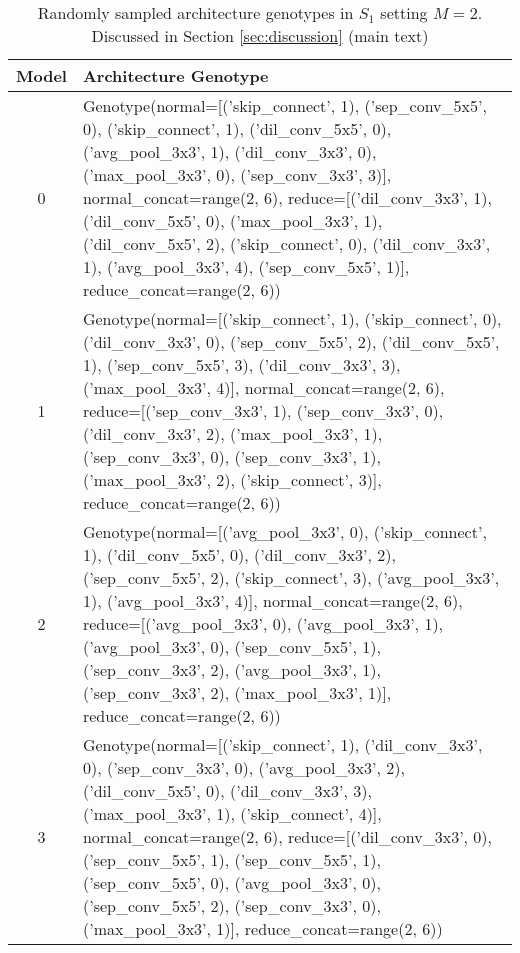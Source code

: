 \documentclass[runningheads]{llncs}
\begin{document}
\begin{table*}
	\begin{center}
		\caption{Randomly sampled architecture genotypes in $S_1$ setting $M=2$. Discussed in Section \ref{sec:discussion} (main text)}
		\label{tab:random-m2noflops}
		\begin{footnotesize}
			\begin{tabular}{cp{11cm}}  
				\hline
				Model & Architecture Genotype  \\
				\hline
				0 & Genotype(normal=[('skip\_connect', 1), ('sep\_conv\_5x5', 0), ('skip\_connect', 1), ('dil\_conv\_5x5', 0), ('avg\_pool\_3x3', 1), ('dil\_conv\_3x3', 0), ('max\_pool\_3x3', 0), ('sep\_conv\_3x3', 3)], normal\_concat=range(2, 6),
				reduce=[('dil\_conv\_3x3', 1), ('dil\_conv\_5x5', 0), ('max\_pool\_3x3', 1), ('dil\_conv\_5x5', 2), ('skip\_connect', 0), ('dil\_conv\_3x3', 1), ('avg\_pool\_3x3', 4), ('sep\_conv\_5x5', 1)], reduce\_concat=range(2, 6))
				
				\\
				1 & Genotype(normal=[('skip\_connect', 1), ('skip\_connect', 0), ('dil\_conv\_3x3', 0), ('sep\_conv\_5x5', 2), ('dil\_conv\_5x5', 1), ('sep\_conv\_5x5', 3), ('dil\_conv\_3x3', 3), ('max\_pool\_3x3', 4)], normal\_concat=range(2, 6),
				reduce=[('sep\_conv\_3x3', 1), ('sep\_conv\_3x3', 0), ('dil\_conv\_3x3', 2), ('max\_pool\_3x3', 1), ('sep\_conv\_3x3', 0), ('sep\_conv\_3x3', 1), ('max\_pool\_3x3', 2), ('skip\_connect', 3)], reduce\_concat=range(2, 6))
				
				\\
				2 &  Genotype(normal=[('avg\_pool\_3x3', 0), ('skip\_connect', 1), ('dil\_conv\_5x5', 0), ('dil\_conv\_3x3', 2), ('sep\_conv\_5x5', 2), ('skip\_connect', 3), ('avg\_pool\_3x3', 1), ('avg\_pool\_3x3', 4)], normal\_concat=range(2, 6),
				reduce=[('avg\_pool\_3x3', 0), ('avg\_pool\_3x3', 1), ('avg\_pool\_3x3', 0), ('sep\_conv\_5x5', 1), ('sep\_conv\_3x3', 2), ('avg\_pool\_3x3', 1), ('sep\_conv\_3x3', 2), ('max\_pool\_3x3', 1)], reduce\_concat=range(2, 6))
				
				\\
				3& Genotype(normal=[('skip\_connect', 1), ('dil\_conv\_3x3', 0), ('sep\_conv\_3x3', 0), ('avg\_pool\_3x3', 2), ('dil\_conv\_5x5', 0), ('dil\_conv\_3x3', 3), ('max\_pool\_3x3', 1), ('skip\_connect', 4)], normal\_concat=range(2, 6),
				reduce=[('dil\_conv\_3x3', 0), ('sep\_conv\_5x5', 1), ('sep\_conv\_5x5', 1), ('sep\_conv\_5x5', 0), ('avg\_pool\_3x3', 0), ('sep\_conv\_5x5', 2), ('sep\_conv\_3x3', 0), ('max\_pool\_3x3', 1)], reduce\_concat=range(2, 6))
				

\end{tabular}
\end{footnotesize}
\end{center}
\end{table*}
\end{document}

